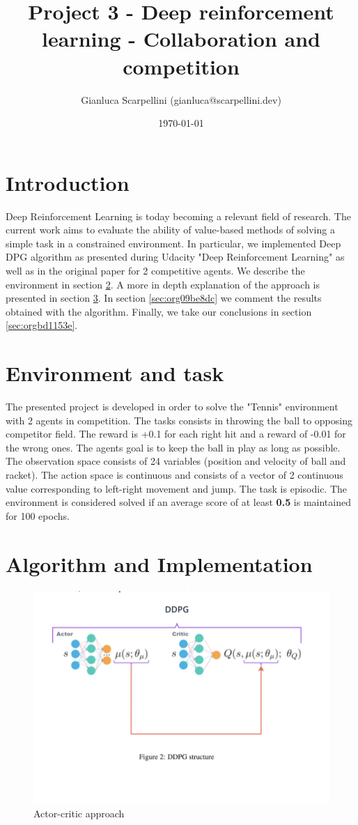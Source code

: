 \documentclass[11pt]{article}
\author{Gianluca Scarpellini (gianluca@scarpellini.dev)}
\date{\today}
\title{Project 3 - Deep reinforcement learning - Collaboration and competition}
\begin{document}
\maketitle
\tableofcontents


\section{Introduction}
\label{sec:orge7a8451}
Deep Reinforcement Learning is today becoming a relevant field of research. The
current work aims to evaluate the ability of value-based methods of solving a
simple task in a constrained environment. In particular, we implemented Deep DPG
algorithm as presented during Udacity "Deep Reinforcement Learning" as well as
in the original paper for 2 competitive agents. We describe the environment in
section \ref{sec:orgf68bd06}. A more in depth explanation of the approach is
presented in section \ref{sec:orgc2b7730}. In section \ref{sec:org09be8dc} we comment the
results obtained with the algorithm. Finally, we take our conclusions in section
\ref{sec:orgbd1153e}.


\section{Environment and task}
\label{sec:orgf68bd06}
The presented project is developed in order to solve the "Tennis" environment
with 2 agents in competition. The tasks consists in throwing the ball to
opposing competitor field. The reward is +0.1 for each right hit and a reward
of -0.01 for the wrong ones. The agents goal is to keep the ball in play as long
as possible. The observation space consists of 24 variables (position and
velocity of ball and racket). The action space is continuous and consists of a
vector of 2 continuous value corresponding to left-right movement and jump. The
task is episodic. The environment is considered solved if an average score of at
least \textbf{0.5} is maintained for 100 epochs.

\section{Algorithm and Implementation}
\label{sec:orgc2b7730}
\begin{figure}[htbp]
\centering
\includegraphics[width=.9\linewidth]{../contents/agentcritic.png}
\caption{\label{fig:org3b240ea}Actor-critic approach}
\end{figure}
\end{document}
